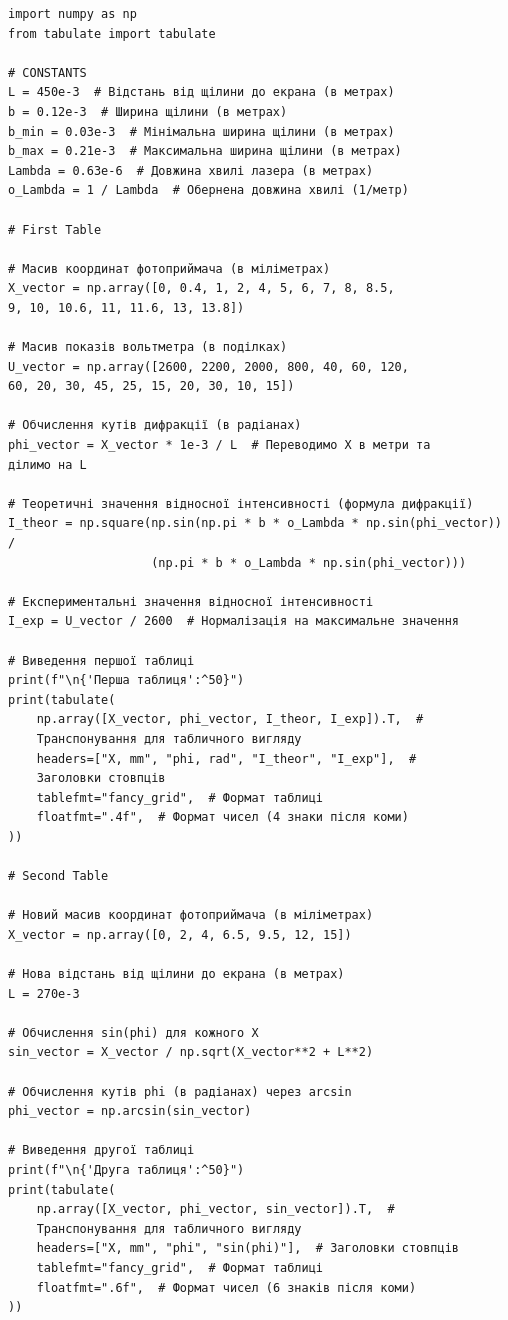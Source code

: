 \documentclass[12pt,a4paper]{article}
\begin{document}
    \small{ 

\begin{verbatim}
import numpy as np
from tabulate import tabulate

# CONSTANTS
L = 450e-3  # Відстань від щілини до екрана (в метрах)
b = 0.12e-3  # Ширина щілини (в метрах)
b_min = 0.03e-3  # Мінімальна ширина щілини (в метрах)
b_max = 0.21e-3  # Максимальна ширина щілини (в метрах)
Lambda = 0.63e-6  # Довжина хвилі лазера (в метрах)
o_Lambda = 1 / Lambda  # Обернена довжина хвилі (1/метр)

# First Table

# Масив координат фотоприймача (в міліметрах)
X_vector = np.array([0, 0.4, 1, 2, 4, 5, 6, 7, 8, 8.5,
9, 10, 10.6, 11, 11.6, 13, 13.8])

# Масив показів вольтметра (в поділках)
U_vector = np.array([2600, 2200, 2000, 800, 40, 60, 120,
60, 20, 30, 45, 25, 15, 20, 30, 10, 15])

# Обчислення кутів дифракції (в радіанах)
phi_vector = X_vector * 1e-3 / L  # Переводимо X в метри та
ділимо на L

# Теоретичні значення відносної інтенсивності (формула дифракції)
I_theor = np.square(np.sin(np.pi * b * o_Lambda * np.sin(phi_vector)) / 
                    (np.pi * b * o_Lambda * np.sin(phi_vector)))

# Експериментальні значення відносної інтенсивності
I_exp = U_vector / 2600  # Нормалізація на максимальне значення

# Виведення першої таблиці
print(f"\n{'Перша таблиця':^50}")
print(tabulate(
    np.array([X_vector, phi_vector, I_theor, I_exp]).T,  #
    Транспонування для табличного вигляду
    headers=["X, mm", "phi, rad", "I_theor", "I_exp"],  #
    Заголовки стовпців
    tablefmt="fancy_grid",  # Формат таблиці
    floatfmt=".4f",  # Формат чисел (4 знаки після коми)
))

# Second Table

# Новий масив координат фотоприймача (в міліметрах)
X_vector = np.array([0, 2, 4, 6.5, 9.5, 12, 15])

# Нова відстань від щілини до екрана (в метрах)
L = 270e-3

# Обчислення sin(phi) для кожного X
sin_vector = X_vector / np.sqrt(X_vector**2 + L**2)

# Обчислення кутів phi (в радіанах) через arcsin
phi_vector = np.arcsin(sin_vector)

# Виведення другої таблиці
print(f"\n{'Друга таблиця':^50}")
print(tabulate(
    np.array([X_vector, phi_vector, sin_vector]).T,  #
    Транспонування для табличного вигляду
    headers=["X, mm", "phi", "sin(phi)"],  # Заголовки стовпців
    tablefmt="fancy_grid",  # Формат таблиці
    floatfmt=".6f",  # Формат чисел (6 знаків після коми)
))


\end{verbatim}}
\end{document}

